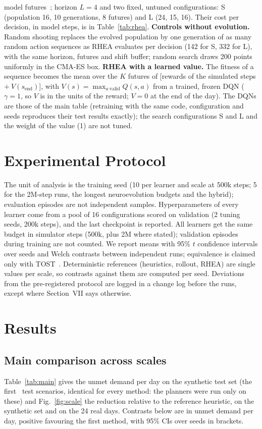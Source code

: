 \documentclass[conference,a4paper]{IEEEtran}
\begin{document}
model futures~\cite{perezliebana2013}; horizon $L=4$ and two fixed, untuned configurations: S (population 16, 10 generations, 8 futures) and L (24, 15, 16). Their cost
per decision, in model steps, is in Table~\ref{tab:rhea}.
\textbf{Controls without evolution.} Random shooting replaces the evolved population by one generation of as many random action sequences as RHEA evaluates per decision
(142 for S, 332 for L), with the same horizon, futures and shift buffer; random search draws 200 points uniformly in the CMA-ES box.
\textbf{RHEA with a learned value.} The fitness of a sequence becomes the mean over the $K$ futures of [rewards of the simulated steps $+\ V(s_{\mathrm{end}})$], with
$V(s)=\max_{a\ \mathrm{valid}}Q(s,a)$ from a trained, frozen DQN ($\gamma=1$, so $V$ is in the units of the reward; $V=0$ at the end of the day). The DQNs are those of the main table
(retraining with the same code, configuration and seeds reproduces their test results exactly); the search configurations S and L and the weight of the value (1) are not tuned.

\section{Experimental Protocol}
The unit of analysis is the training seed (10 per learner and scale at 500k steps; 5 for the 2M-step runs, the longest neuroevolution budgets and the hybrid); evaluation episodes are not independent samples.
Hyperparameters of every learner come from a pool of 16 configurations scored on validation (2 tuning seeds, 200k steps), and the last checkpoint is reported.
All learners get the same budget in simulator steps (500k, plus 2M where stated); validation episodes during training are not counted. We report means with 95\% $t$
confidence intervals over seeds and Welch contrasts between independent runs; equivalence is claimed only with TOST~\cite{lakens2017}. Deterministic references (heuristics,
rollout, RHEA) are single values per scale, so contrasts against them are computed per seed. Deviations from the pre-registered protocol are logged in a change log before the runs, except where Section~VII says otherwise.

\section{Results}
\subsection{Main comparison across scales}
Table~\ref{tab:main} gives the unmet demand per day on the synthetic test set (the first \cecN\ test scenarios, identical for every method: the planners were run
only on these) and Fig.~\ref{fig:scale} the reduction relative to the reference heuristic, on the synthetic set and on the 24 real days. Contrasts below are in unmet
demand per day, positive favouring the first method, with 95\% CIs over seeds in brackets.
\end{document}
